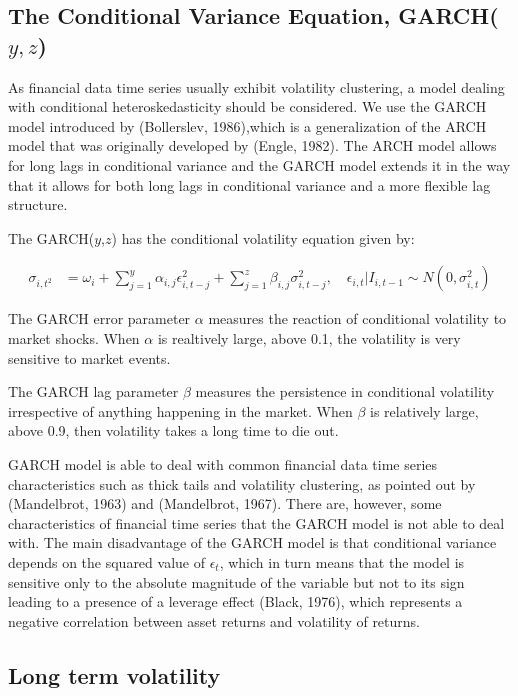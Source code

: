 \subsection*{The Conditional Variance Equation, GARCH($y,z$)}
As financial data time series usually exhibit volatility clustering, a model dealing with
conditional heteroskedasticity should be considered. We use the GARCH model introduced by (Bollerslev, 1986),which is a generalization of the ARCH model that was originally developed by (Engle, 1982). The ARCH model allows for long lags in conditional variance and the GARCH model extends it in the way that it allows for both long lags in conditional variance and a more flexible lag structure.

The GARCH($y$,$z$) has the conditional volatility equation given by:

\begin{align}
    \sigma_{i,t^2} &= \omega_i + \sum_{j=1}^y\alpha_{i,j}\epsilon_{i,t-j}^2+\sum_{j=1}^z\beta_{i,j}\sigma_{i,t-j}^2,\quad\epsilon_{i,t} | I_{i,t-1} \sim N(0,{\sigma_{i,t}^2}) \label{ConditionalVolatilityEquation}
\end{align}

The GARCH error parameter $\alpha$ measures the reaction of conditional volatility to market shocks. When $\alpha$ is realtively large, above 0.1, the volatility is very sensitive to market events.

The GARCH lag parameter $\beta$ measures the persistence in conditional volatility irrespective of anything happening in the market. When $\beta$ is relatively large, above 0.9, then volatility takes a long time to die out.

GARCH model is able to deal with common financial data time series characteristics such as thick tails and volatility clustering, as pointed out by (Mandelbrot, 1963) and (Mandelbrot, 1967). There are, however, some characteristics of financial time series that the GARCH model is not able to deal with. The main disadvantage of the GARCH model is that conditional variance depends on the squared value of $\epsilon_t$, which in turn means that the model is sensitive only to the absolute magnitude of the variable but not to its sign leading to a presence of a leverage effect (Black, 1976), which represents a negative
correlation between asset returns and volatility of returns.

\subsection*{Long term volatility}

